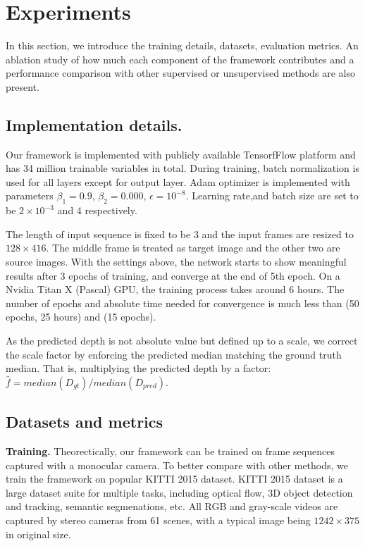 \section{Experiments}
\label{sec:experiments}

In this section, we introduce the training details, datasets, evaluation metrics. An ablation study of how much each component of the framework contributes and a performance comparison with other supervised or unsupervised methods are also present.

\subsection{Implementation details.}

Our framework is implemented with publicly available TensorfFlow \cite{abadi2016tensorflow} platform and has 34 million trainable variables in total. During training, batch normalization \cite{ioffe2015batch} is used for all layers except for output layer. Adam optimizer is implemented with parameters $\beta_1 = 0.9$, $\beta_2=0.000$, $\epsilon=10^{-8}$. Learning rate,and batch size are set to be $2\times10^{-3}$ and 4 respectively.

The length of input sequence is fixed to be 3 and the input frames are resized to $128 \times 416$. The middle frame is treated as target image and the other two are source images. With the settings above, the network starts to show meaningful results after 3 epochs of training, and converge at the end of 5th epoch. On a Nvidia Titan X (Pascal) GPU, the training process takes around 6 hours. The number of epochs and absolute time needed for convergence is much less than \cite{godard2016unsupervised} (50 epochs, 25 hours) and \cite{zhou2017unsupervised} (15 epochs).

As the predicted depth is not absolute value but defined up to a scale, we correct the scale factor by enforcing the predicted median matching the ground truth median. That is, multiplying the predicted depth by a factor: $\hat{f} = median(D_{gt}) / median(D_{pred})$. 

\subsection{Datasets and metrics}
\textbf{Training.}
Theorectically, our framework can be trained on frame sequences captured with a monocular camera. To better compare with other methods, we train the framework on popular KITTI 2015 \cite{geiger2012we} dataset. KITTI 2015 dataset is a large dataset suite for multiple tasks, including optical flow, 3D object detection and tracking, semantic segmenations, etc. All RGB and gray-scale videos are captured by stereo cameras from 61 scenes, with a typical image being $1242 \times 375$ in original size.

